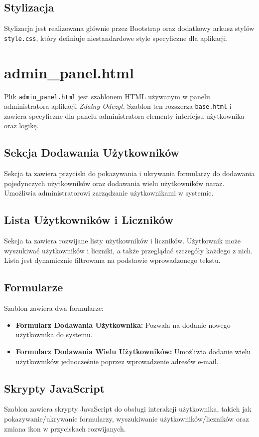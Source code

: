 \documentclass[12pt,a4paper]{report}
\begin{document}
\subsection{Stylizacja}
Stylizacja jest realizowana głównie przez Bootstrap oraz dodatkowy arkusz stylów \texttt{style.css}, który definiuje niestandardowe style specyficzne dla aplikacji.

\section{admin\_panel.html}
\label{sec:adminpanel}
Plik \texttt{admin\_panel.html} jest szablonem HTML używanym w panelu administratora aplikacji \textit{Zdalny Odczyt}. Szablon ten rozszerza \texttt{base.html} i zawiera specyficzne dla panelu administratora elementy interfejsu użytkownika oraz logikę.

\subsection{Sekcja Dodawania Użytkowników}
Sekcja ta zawiera przyciski do pokazywania i ukrywania formularzy do dodawania pojedynczych użytkowników oraz dodawania wielu użytkowników naraz. Umożliwia administratorowi zarządzanie użytkownikami w systemie.

\subsection{Lista Użytkowników i Liczników}
Sekcja ta zawiera rozwijane listy użytkowników i liczników. Użytkownik może wyszukiwać użytkowników i liczniki, a także przeglądać szczegóły każdego z nich. Lista jest dynamicznie filtrowana na podstawie wprowadzonego tekstu.

\subsection{Formularze}
Szablon zawiera dwa formularze:
\begin{itemize}
\item \textbf{Formularz Dodawania Użytkownika:} Pozwala na dodanie nowego użytkownika do systemu.
\item \textbf{Formularz Dodawania Wielu Użytkowników:} Umożliwia dodanie wielu użytkowników jednocześnie poprzez wprowadzenie adresów e-mail.
\end{itemize}

\subsection{Skrypty JavaScript}
Szablon zawiera skrypty JavaScript do obsługi interakcji użytkownika, takich jak pokazywanie/ukrywanie formularzy, wyszukiwanie użytkowników/liczników oraz zmiana ikon w przyciskach rozwijanych.
\end{document}

